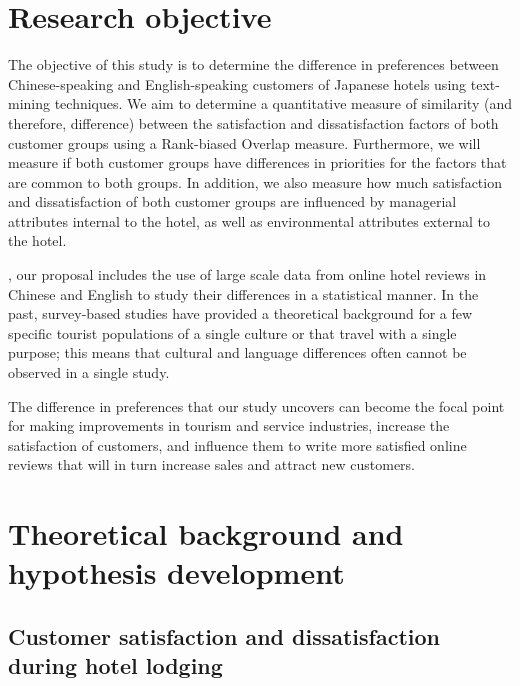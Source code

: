 \section{Research objective}\label{research_objective}

The objective of this study is to determine the difference in preferences between Chinese-speaking and English-speaking customers of Japanese hotels using text-mining techniques. We aim to determine a quantitative measure of similarity (and therefore, difference) between the satisfaction and dissatisfaction factors of both customer groups using a Rank-biased Overlap measure. Furthermore, we will measure if both customer groups have differences in priorities for the factors that are common to both groups. In addition, we also measure how much satisfaction and dissatisfaction of both customer groups are influenced by managerial attributes \DIFaddbegin \DIFadd{(}\DIFaddend internal to the hotel\DIFaddbegin \DIFadd{)}\DIFaddend , as well as environmental attributes \DIFaddbegin \DIFadd{(}\DIFaddend external to the hotel\DIFaddbegin \DIFadd{)}\DIFaddend . 

\DIFdelbegin {}\DIFdelend \DIFaddbegin {}\DIFaddend , our proposal includes the use of large scale data from online hotel reviews in Chinese and English to study their differences in a statistical manner. In the past, survey-based studies have provided a theoretical background for a few specific tourist populations of a single culture or that travel with a single purpose; this means that cultural and language differences often cannot be observed in a single study. 

The difference in preferences that our study uncovers can become the focal point for making improvements in tourism and service industries, increase the satisfaction of customers, and influence them to write more satisfied online reviews that will in turn increase sales and attract new customers. 

\section{Theoretical background and hypothesis development}\label{theory_hypothesis}

\subsection{Customer satisfaction and dissatisfaction during hotel lodging}\label{theory_satisfaction}

